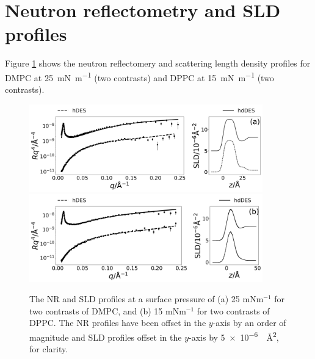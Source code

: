 \documentclass[11pt,a4paper]{paper}
\begin{document}
\section{Neutron reflectometry and SLD profiles}
Figure \ref{fig:neutron} shows the neutron reflectomery and scattering length density profiles for DMPC at \SI{25}{\milli\newton\per\meter} (two contrasts) and DPPC at \SI{15}{\milli\newton\per\meter} (two contrasts).
%
\begin{figure}
	\centering
	\includegraphics[width=0.9\textwidth]{figures/dmpc_25n_ref_sld}
	\includegraphics[width=0.9\textwidth]{figures/dppc_15n_ref_sld}
	\caption{The NR and SLD profiles at a surface pressure of (a) 25 mNm$^{-1}$ for two contrasts of DMPC, and (b) 15 mNm$^{-1}$ for two contrasts of DPPC. The NR profiles have been offset in the $y$-axis by an order of magnitude and SLD profiles offset in the $y$-axis by \SI{5e-6}{\per\square\angstrom}, for clarity.}
	\label{fig:neutron}
\end{figure}
%
\end{document}
